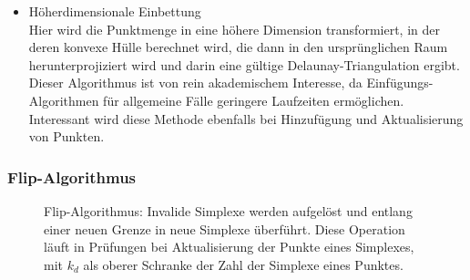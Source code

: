 \begin{itemize}
\item Höherdimensionale Einbettung\\
  Hier wird die Punktmenge in eine höhere Dimension transformiert, in der deren konvexe Hülle berechnet wird, die dann in den ursprünglichen Raum herunterprojiziert wird und darin eine gültige Delaunay-Triangulation ergibt.
  Dieser Algorithmus ist von rein akademischem Interesse, da Einfügungs-Algorithmen für allgemeine Fälle geringere Laufzeiten ermöglichen.
  Interessant wird diese Methode ebenfalls bei Hinzufügung und Aktualisierung von Punkten.

\end{itemize}

\subsubsection{Flip-Algorithmus}

\begin{figure}[bhpt]
  \caption{
    Flip-Algorithmus: Invalide Simplexe werden aufgelöst und entlang einer neuen Grenze in neue Simplexe überführt.
    Diese Operation läuft in  Prüfungen bei Aktualisierung der Punkte eines Simplexes, mit $k_d$ als oberer Schranke der Zahl der Simplexe eines Punktes.
  }
  \label{fig:delaunay-flip}
\end{figure}

